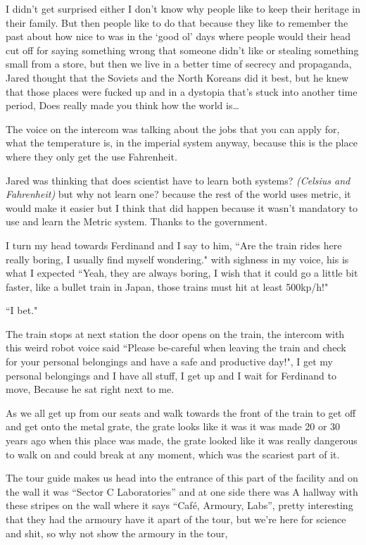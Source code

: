 \documentclass[14pt,letterpaper]{book}
\begin{document}
I didn't get surprised either I don't know why people like to keep their heritage in their family. But then people like to do that because they like to remember the past about how nice to was in the `good ol' days where people would their head cut off for saying something wrong that someone didn't like or stealing something small from a store, but then we live in a better time of secrecy and propaganda, Jared thought that the Soviets and the North Koreans did it best, but he knew that those places were fucked up and in a dystopia that's stuck into another time period, Does really made you think how the world is\ldots

The voice on the intercom was talking about the jobs that you can apply for, what the temperature is, in the imperial system anyway, because this is the place where they only get the use Fahrenheit.

Jared was thinking that does scientist have to learn both systems? \textit{(Celsius and Fahrenheit)} but why not learn one? because the rest of the world uses metric, it would make it easier but I think that did happen because it wasn't mandatory to use and learn the Metric system. Thanks to the government.

I turn my head towards Ferdinand and I say to him, ``Are the train rides here really boring, I usually find myself wondering." with sighness in my voice, his is what I expected ``Yeah, they are always boring, I wish that it could go a little bit faster, like a bullet train in Japan, those trains must hit at least 500kp/h!"

``I bet."
 
The train stops at next station the door opens on the train, the intercom with this weird robot voice said ``Please be-careful when leaving the train and check for your personal belongings and have a safe and productive day!", I get my personal belongings and I have all stuff, I get up and I wait for Ferdinand to move, Because he sat right next to me.

As we all get up from our seats and walk towards the front of the train to get off and get onto the metal grate, the grate looks like it was it was made 20 or 30 years ago when this place was made, the grate looked like it was really dangerous to walk on and could break at any moment, which was the scariest part of it. 

The tour guide makes us head into the entrance of this part of the facility and on the wall it was ``Sector C Laboratories'' and at one side there was A hallway with these stripes on the wall where it says ``Café, Armoury, Labs'', pretty interesting that they had the armoury have it apart of the tour, but we're here for science and shit, so why not show the armoury in the tour, 
 
\end{document}
